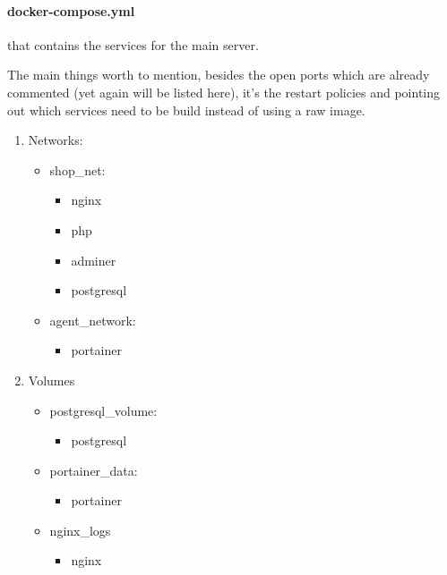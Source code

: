     \paragraph{docker-compose.yml} that contains the services for the main server.
    \newpage
    \newpage
    \begin{flushleft}
        The main things worth to mention, besides the open ports which are already commented (yet again will be listed here),
        it's the restart policies and pointing out which services need to be build instead of using a raw image.
    \end{flushleft}
    \begin{enumerate}
        \item Networks:
            \begin{itemize}
                \item shop\_net:
                \begin{itemize}
                    \item nginx
                    \item php
                    \item adminer
                    \item postgresql
                \end{itemize}
                \item agent\_network:
                \begin{itemize}
                    \item portainer
                \end{itemize}
            \end{itemize}
        \item Volumes
            \begin{itemize}
                \item postgresql\_volume:
                \begin{itemize}
                      \item postgresql
                \end{itemize}
                \item portainer\_data:
                \begin{itemize}
                      \item portainer
                \end{itemize}
                \item nginx\_logs
                \begin{itemize}
                    \item nginx
                \end{itemize}
            \end{itemize}

    \end{enumerate}

